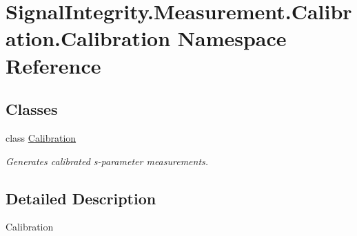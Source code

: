 \hypertarget{namespaceSignalIntegrity_1_1Measurement_1_1Calibration_1_1Calibration}{}\section{Signal\+Integrity.\+Measurement.\+Calibration.\+Calibration Namespace Reference}
\label{namespaceSignalIntegrity_1_1Measurement_1_1Calibration_1_1Calibration}
\subsection*{Classes}
\begin{DoxyCompactItemize}
\item 
class \hyperlink{classSignalIntegrity_1_1Measurement_1_1Calibration_1_1Calibration_1_1Calibration}{Calibration}
\begin{DoxyCompactList}\small\item\em Generates calibrated s-\/parameter measurements. \end{DoxyCompactList}\end{DoxyCompactItemize}


\subsection{Detailed Description}
\begin{DoxyVerb}Calibration\end{DoxyVerb}
 